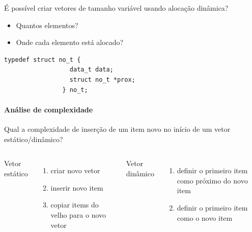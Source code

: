 \begin{frame}[fragile,label=notas]
	É possível criar vetores de tamanho variável usando alocação dinâmica?
	\pause
	\begin{itemize}[<+->]
		\item Quantos elementos?
		\item Onde cada elemento está alocado?
	\end{itemize}
	\vfill
	\begin{center}
		\begin{minipage}{.3\textwidth}
			\begin{lstlisting}[title=Elemento do vetor dinâmico]
				typedef struct no_t {
				  data_t data;
				  struct no_t *prox;
				} no_t;
			\end{lstlisting}
		\end{minipage}
	\end{center}
\end{frame}

\begin{frame}[label=notas]
	\framesubtitle{Análise de complexidade}
	
	Qual a complexidade de inserção de um item novo no início de um vetor estático/dinâmico?
	\\\vfill\pause
	\begin{columns}
			Vetor estático \uncover<4>{$O(n)$}
			\begin{enumerate}
				\item criar novo vetor
				\item inserir novo item
				\item \alert<4>{copiar items do velho para o novo vetor}
			\end{enumerate}
			\pause
			Vetor dinâmico \uncover<4>{$O(1)$}
			\begin{enumerate}
				\item definir o primeiro item como próximo do novo item
				\item definir o primeiro item como o novo item
			\end{enumerate}
	\end{columns}
\end{frame}